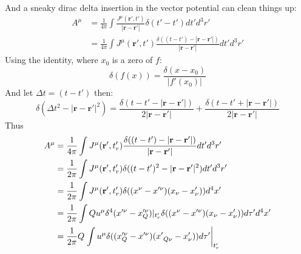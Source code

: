 \documentclass[12pt,a4]{article}
\begin{document}
\begin{enumerate}
\begin{enumerate}
\begin{gather*}
        \end{gather*}
        And a sneaky dirac delta insertion in the vector potential can clean things up:
        \begin{align*}
          A^\mu &= \frac{1}{4 \pi}\int \frac{J^\mu (\mathbf{r}', t')}{|\mathbf{r} - \mathbf{r}'|} \delta(t' - t')dt' d^3 r'\\
                &= \frac{1}{4 \pi}\int J^\mu (\mathbf{r}', t') \frac{\delta((t - t') - |\mathbf{r} - \mathbf{r}'|)}{|\mathbf{r} - \mathbf{r}'|}dt' d^3 r'
        \end{align*}
        Using the identity, where $x_0$ is a zero of $f$:
        \begin{equation}
          \delta(f(x)) = \frac{\delta(x - x_0)}{|f'(x_0)|}
          \label{eq:diracdeltafunction}
        \end{equation}
        And let $\Delta t = (t - t')$ then:
        \begin{equation*}
          \delta(\Delta t^2 - |\mathbf{r} - \mathbf{r}'|^2) = \frac{\delta(t - t' - |\mathbf{r} - \mathbf{r}'|)}{2 |\mathbf{r} - \mathbf{r}'|} + \frac{\delta(t - t' + |\mathbf{r} - \mathbf{r}'|)}{2 |\mathbf{r} - \mathbf{r}'|}
        \end{equation*}
        Thus
        \begin{align*}
          A^\mu &=\frac{1}{4 \pi}\int J^\mu (\mathbf{r}', t_r') \frac{\delta((t - t') - |\mathbf{r} - \mathbf{r}'|)}{|\mathbf{r} - \mathbf{r}'|}dt' d^3 r'\\
                &=\frac{1}{2 \pi}\int J^\mu (\mathbf{r}', t_r') \delta((t - t')^2 - |\mathbf{r} - \mathbf{r}'|^2)dt' d^3 r'\\
                &=\frac{1}{2 \pi}\int J^\mu (\mathbf{r}', t_r') \delta((x^\nu - x'^\nu)(x_\nu - x'_\nu))d^4x'\\
                &=\frac{1}{2 \pi}\int Q u^\mu \delta^4(x'^\nu - x_Q'^\nu)|_{t'_r} \delta((x^\nu - x'^\nu)(x_\nu - x'_\nu))d \tau' d^4x' \\
                &=\frac{1}{2 \pi}Q \left.\int  u^\mu \delta((x_Q'^\nu - x'^\nu)(x'\tensor{}{_Q_\nu} - x'_\nu)) d \tau' \right|_{t'_r}

\end{align*}
\end{enumerate}
\end{enumerate}
\end{document}
